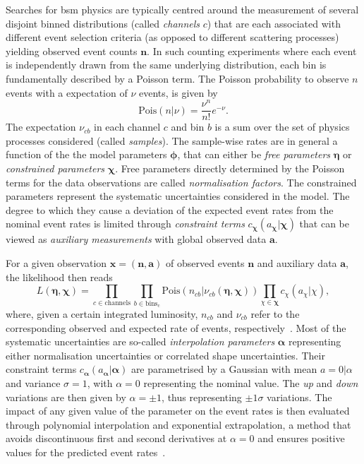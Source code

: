 Searches for \gls{bsm} physics are typically centred around the measurement of several disjoint binned distributions (called \textit{channels} $c$) that are each associated with different event selection criteria (as opposed to different scattering processes) yielding observed event counts $\boldsymbol{n}$. In such counting experiments where each event is independently drawn from the same underlying distribution, each bin is fundamentally described by a Poisson term. The Poisson probability to observe $n$ events with a expectation of $\nu$ events, is given by
\begin{equation}
	\mathrm{Pois}(n\vert\nu) = \frac{\nu^n}{n!}e^{-\nu}.
\end{equation}
The expectation $\nu_{cb}$ in each channel $c$ and bin $b$ is a sum over the set of physics processes considered (called \textit{samples}). The sample-wise rates are in general a function of the the model parameters $\boldsymbol{\phi}$, that can either be \textit{free parameters} $\boldsymbol{\eta}$ or \textit{constrained parameters} $\boldsymbol{\chi}$. Free parameters directly determined by the Poisson terms for the data observations are called \textit{normalisation factors}. The constrained parameters represent the systematic uncertainties considered in the model. The degree to which they cause a deviation of the expected event rates from the nominal event rates is limited through \textit{constraint terms} $c_{\boldsymbol{\chi}}(a_{\boldsymbol{\chi}}\vert\boldsymbol{\chi})$ that can be viewed as \textit{auxiliary measurements} with global observed data $\boldsymbol{a}$. 

For a given observation $\boldsymbol{x} = (\boldsymbol{n},\boldsymbol{a})$ of observed events $\boldsymbol{n}$ and auxiliary data $\boldsymbol{a}$, the likelihood then reads
\begin{equation}
	L (\boldsymbol{\eta}, \boldsymbol{\chi}) = \prod_{c\in\mathrm{channels}} \prod_{b\in\mathrm{bins_c}} \mathrm{Pois}(n_{cb}\vert\nu_{cb}(\boldsymbol{\eta},\boldsymbol{\chi})) \prod_{\chi\in\boldsymbol{\chi}}c_\chi (a_\chi\vert\chi),
\end{equation}
where, given a certain integrated luminosity, $n_{cb}$ and $\nu_{cb}$ refer to the corresponding observed and expected rate of events, respectively~\cite{ATL-PHYS-PUB-2019-029}. Most of the systematic uncertainties are so-called \textit{interpolation parameters} $\boldsymbol{\alpha}$ representing either normalisation uncertainties or correlated shape uncertainties. Their constraint terms $c_{\boldsymbol{\alpha}}(a_{\boldsymbol{\alpha}}\vert\boldsymbol{\alpha})$ are parametrised by a Gaussian with mean $a = 0\vert\alpha$ and variance $\sigma = 1$, with $\alpha = 0$ representing the nominal value. The \textit{up} and \textit{down} variations are then given by $\alpha=\pm 1$, thus representing $\pm 1\sigma$ variations. The impact of any given value of the parameter on the event rates is then evaluated through polynomial interpolation and exponential extrapolation, a method that avoids discontinuous first and second derivatives at $\alpha = 0$ and ensures positive values for the predicted event rates~\cite{Cranmer:1456844}.

